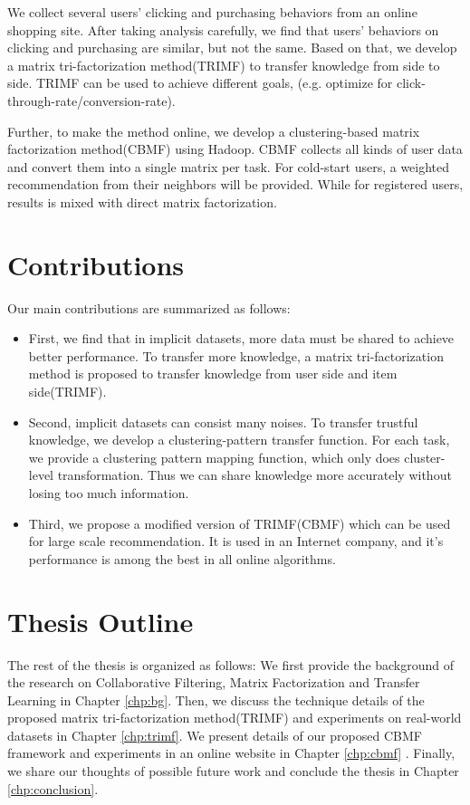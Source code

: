 We collect several users' clicking and purchasing behaviors from an online shopping site. After taking analysis carefully, we find that users' behaviors on clicking and purchasing are similar, but not the same. Based on that, we develop a matrix tri-factorization method(TRIMF) to transfer knowledge from side to side. TRIMF can be used to achieve different goals, (e.g. optimize for click-through-rate/conversion-rate).

Further, to make the method online, we develop a clustering-based matrix factorization method(CBMF) using Hadoop. CBMF collects all kinds of user data and convert them into a single matrix per task. For cold-start users, a weighted recommendation from their neighbors will be provided. While for registered users, results is mixed with direct matrix factorization.

\hspace{0.1in}
\section{Contributions}

Our main contributions are summarized as follows:

\begin{itemize}[noitemsep,topsep=0pt,parsep=0pt,partopsep=0pt]
\item First, we find that in implicit datasets, more data must be shared to achieve better performance. To transfer more knowledge, a matrix tri-factorization method is proposed to transfer knowledge from user side and item side(TRIMF).
\item Second, implicit datasets can consist many noises. To transfer trustful knowledge, we develop a clustering-pattern transfer function. For each task, we provide a clustering pattern mapping function, which only does cluster-level transformation. Thus we can share knowledge more accurately without losing too much information.
\item Third, we propose a modified version of TRIMF(CBMF) which can be used for large scale recommendation. It is used in an Internet company, and it's performance is among the best in all online algorithms.
\end{itemize}

\hspace{0.1in}
\section{Thesis Outline}

The rest of the thesis is organized as follows: We first provide the background of the research on Collaborative Filtering, Matrix Factorization and Transfer Learning in Chapter \ref{chp:bg}. Then, we discuss the technique details of the proposed matrix tri-factorization method(TRIMF) and experiments on real-world datasets in Chapter \ref{chp:trimf}. We present details of our proposed CBMF framework and experiments in an online website in Chapter \ref{chp:cbmf} . Finally, we share our thoughts of possible future work and conclude the thesis in Chapter \ref{chp:conclusion}.



